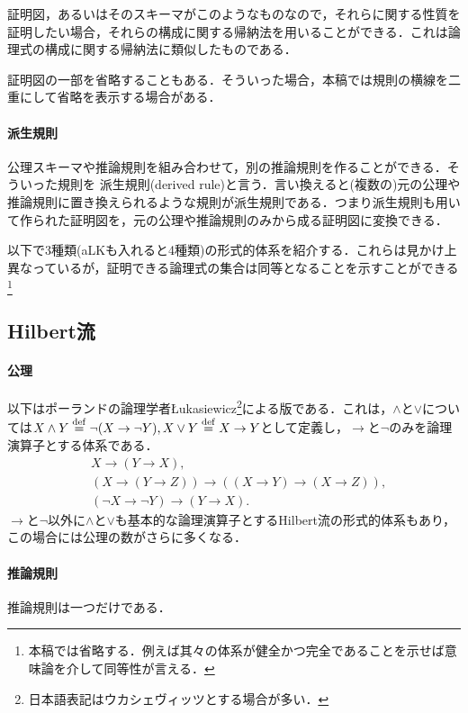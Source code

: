 \documentclass{ltjsarticle}
\theoremstyle{mystyle1}
\theoremstyle{mystyle2}
\newcommand{\dequal}{\ensuremath{\stackrel{\rm{def}}{=}}}
\newcommand{\red}[1]{{\color{red} #1}}
\begin{document}
証明図，あるいはそのスキーマがこのようなものなので，それらに関する性質を証明したい場合，それらの構成に関する帰納法を用いることができる．これは論理式の構成に関する帰納法に類似したものである．

証明図の一部を省略することもある．そういった場合，本稿では規則の横線を二重にして省略を表示する場合がある．
\paragraph{派生規則}
公理スキーマや推論規則を組み合わせて，別の推論規則を作ることができる．そういった規則を\red{派生規則}(derived rule)と言う．言い換えると(複数の)元の公理や推論規則に置き換えられるような規則が派生規則である．つまり派生規則も用いて作られた証明図を，元の公理や推論規則のみから成る証明図に変換できる．

以下で3種類(aLKも入れると4種類)の形式的体系を紹介する．これらは見かけ上異なっているが，証明できる論理式の集合は同等となることを示すことができる\footnote{本稿では省略する．例えば其々の体系が健全かつ完全であることを示せば意味論を介して同等性が言える．}
\subsection{Hilbert流}
\paragraph{公理}
以下はポーランドの論理学者\L ukasiewicz\footnote{日本語表記はウカシェヴィッツとする場合が多い．}による版である．これは，$\wedge$と$\vee$については$X\wedge Y\dequal \neg(X \to \neg Y), X\vee Y\dequal X\to Y$として定義し，$\to$と$\neg$のみを論理演算子とする体系である．
\begin{align}
   & X \to \left(Y\to X\right),\label{hilbert1}                                                                          \\
   & \left(X \to \left(Y \to Z\right)\right)\to \left(\left(X\to Y\right)\to \left(X\to Z\right)\right),\label{hilbert2} \\
   & \left(\neg X\to \neg Y\right) \to \left(Y\to X\right).\label{hilbert3}
\end{align}
$\to$と$\neg$以外に$\wedge$と$\vee$も基本的な論理演算子とするHilbert流の形式的体系もあり，この場合には公理の数がさらに多くなる．
\paragraph{推論規則}
推論規則は一つだけである．
\begin{prooftree}
  \label{HilInfRule}
\end{prooftree}
\end{document}

